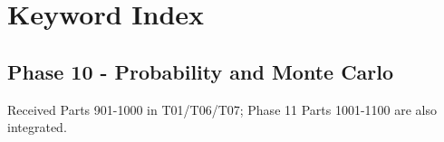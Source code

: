 \hypertarget{appendix-a6d556a4ef50}{}\label{referencestart:appendix-a6d556a4ef50}
\section{Keyword Index}\label{appendix-a6d556a4ef50-keyword-index}

\hypertarget{appendix-a6d556a4ef50-keyword-index}{}

\subsection{Phase 10 - Probability and Monte Carlo}\label{appendix-a6d556a4ef50-phase-10---probability-and-monte-carlo}

\hypertarget{appendix-a6d556a4ef50-phase-10---probability-and-monte-carlo}{}

Received Parts 901-1000 in T01/T06/T07; Phase 11 Parts 1001-1100 are also integrated.

